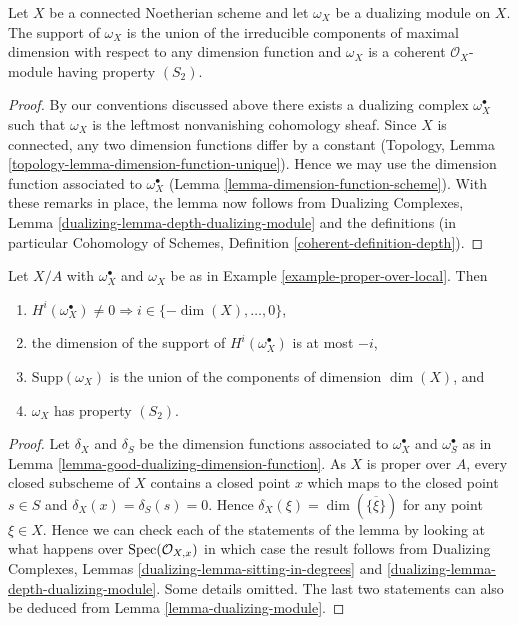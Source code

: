\begin{lemma}
\label{lemma-dualizing-module}
Let $X$ be a connected Noetherian scheme and let $\omega_X$ be a dualizing
module on $X$. The support of $\omega_X$ is the union of the irreducible
components of maximal dimension with respect to any dimension function
and $\omega_X$ is a coherent $\mathcal{O}_X$-module having property $(S_2)$.
\end{lemma}

\begin{proof}
By our conventions discussed above there exists a dualizing complex
$\omega_X^\bullet$ such that $\omega_X$ is the leftmost nonvanishing
cohomology sheaf. Since $X$ is connected, any two dimension functions
differ by a constant
(Topology, Lemma \ref{topology-lemma-dimension-function-unique}).
Hence we may use the
dimension function associated to $\omega_X^\bullet$
(Lemma \ref{lemma-dimension-function-scheme}).
With these remarks in place, the lemma now
follows from Dualizing Complexes, Lemma
\ref{dualizing-lemma-depth-dualizing-module}
and the definitions (in particular
Cohomology of Schemes, Definition \ref{coherent-definition-depth}).
\end{proof}

\begin{lemma}
\label{lemma-vanishing-good-dualizing}
Let $X/A$ with $\omega_X^\bullet$ and $\omega_X$ be as in
Example \ref{example-proper-over-local}. Then
\begin{enumerate}
\item $H^i(\omega_X^\bullet) \not = 0 \Rightarrow
i \in \{-\dim(X), \ldots, 0\}$,
\item the dimension of the support of $H^i(\omega_X^\bullet)$ is at most $-i$,
\item $\text{Supp}(\omega_X)$ is the union of
the components of dimension $\dim(X)$, and
\item $\omega_X$ has property $(S_2)$.
\end{enumerate}
\end{lemma}

\begin{proof}
Let $\delta_X$ and $\delta_S$ be the dimension functions associated to
$\omega_X^\bullet$ and $\omega_S^\bullet$ as in
Lemma \ref{lemma-good-dualizing-dimension-function}.
As $X$ is proper over $A$, every closed subscheme of $X$ contains
a closed point $x$ which maps to the closed point $s \in S$
and $\delta_X(x) = \delta_S(s) = 0$. Hence
$\delta_X(\xi) = \dim(\overline{\{\xi\}})$ for any point
$\xi \in X$. Hence we can check each of
the statements of the lemma by looking at what happens over
$\mathop{\mathrm{Spec}}(\mathcal{O}_{X, x})$ in which case the result follows
from Dualizing Complexes, Lemmas \ref{dualizing-lemma-sitting-in-degrees} and
\ref{dualizing-lemma-depth-dualizing-module}.
Some details omitted.
The last two statements can also be deduced from
Lemma \ref{lemma-dualizing-module}.
\end{proof}

